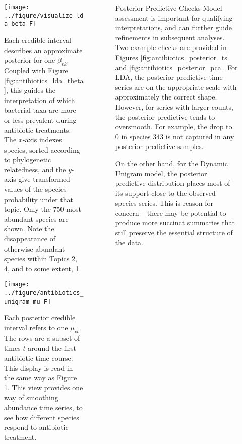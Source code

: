 \documentclass[final]{beamer}
\newlength{\onecolwid}
\begin{document}
\begin{frame}
\begin{columns}
\begin{column}{\onecolwid}
\begin{figure}[!p]
  \centering\texttt{[image: ../figure/visualize\_lda\_beta-F]}
  \caption{Each credible interval describes an approximate posterior for one
    $\beta_{vk}$. Coupled with Figure \ref{fig:antibiotics_lda_theta}, this
    guides the interpretation of which bacterial taxa are more or less prevalent
    during antibiotic treatments. The $x$-axis indexes species, sorted according
    to phylogenetic relatedness, and the $y$-axis give transformed values of the
    species probability under that topic. Only the 750 most abundant species are
    shown. Note the disappearance of otherwise abundant species within Topics 2,
    4, and to some extent, 1.} \label{fig:antibiotics_lda_beta}
\end{figure}

\begin{figure}[ht]
  \centering
  \texttt{[image: ../figure/antibiotics\_unigram\_mu-F]}
  \caption{Each posterior credible interval refers to one $\mu_{vt}$. The rows
    are a subset of times $t$ around the first antibiotic time course. This
    display is read in the same way as Figure \ref{fig:antibiotics_lda_beta}.
    This view provides one way of smoothing abundance time series, to see how
    different species respond to antibiotic
    treatment. \label{fig:antibiotics_unigram_theta} }
\end{figure}


\end{column}

\begin{column}{\onecolwid}

\begin{block}{Posterior Predictive Checks}
Model assessment is important for qualifying interpretations, and can further
guide refinements in subsequent analyses. Two example checks are provided in
Figures \ref{fig:antibiotics_posterior_ts} and
\ref{fig:antibiotics_posterior_pca}. For LDA, the posterior predictive time
series are on the appropriate scale with approximately the correct shape.
However, for series with larger counts, the posterior predictive tends to
oversmooth. For example, the drop to 0 in species 343 is not captured in any
posterior predictive samples.

On the other hand, for the Dynamic Unigram model, the posterior predictive
distribution places most of its support close to the observed species series.
This is reason for concern -- there may be potential to produce more succinct
summaries that still preserve the essential structure of the data.


\end{block}
\end{column}
\end{columns}
\end{frame}
\end{document}
